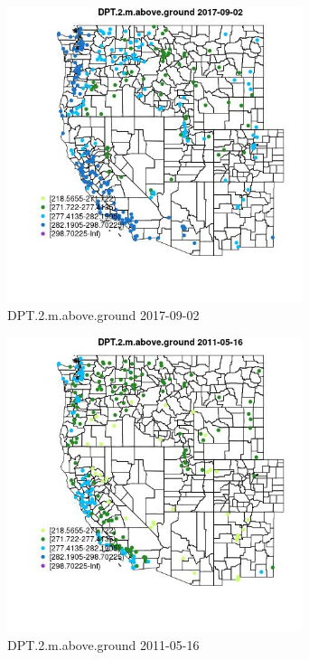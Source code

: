 \begin{figure} 
\centering  
\includegraphics[width=0.77\textwidth]{Code_Outputs/Report_ML_input_PM25_Step4_part_e_de_duplicated_aves_compiled_2019-05-21wNAs_MapObsDPT2maboveground2017-09-02.jpg} 
\caption{\label{fig:Report_ML_input_PM25_Step4_part_e_de_duplicated_aves_compiled_2019-05-21wNAsMapObsDPT2maboveground2017-09-02}DPT.2.m.above.ground 2017-09-02} 
\end{figure} 
 

\begin{figure} 
\centering  
\includegraphics[width=0.77\textwidth]{Code_Outputs/Report_ML_input_PM25_Step4_part_e_de_duplicated_aves_compiled_2019-05-21wNAs_MapObsDPT2maboveground2011-05-16.jpg} 
\caption{\label{fig:Report_ML_input_PM25_Step4_part_e_de_duplicated_aves_compiled_2019-05-21wNAsMapObsDPT2maboveground2011-05-16}DPT.2.m.above.ground 2011-05-16} 
\end{figure} 
 

